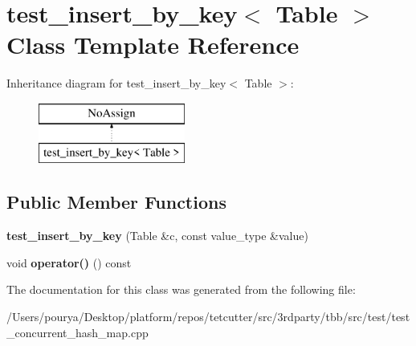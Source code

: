 \hypertarget{classtest__insert__by__key}{}\section{test\+\_\+insert\+\_\+by\+\_\+key$<$ Table $>$ Class Template Reference}
\label{classtest__insert__by__key}
Inheritance diagram for test\+\_\+insert\+\_\+by\+\_\+key$<$ Table $>$\+:\begin{figure}[H]
\begin{center}
\leavevmode
\includegraphics[height=2.000000cm]{classtest__insert__by__key}
\end{center}
\end{figure}
\subsection*{Public Member Functions}
\begin{DoxyCompactItemize}
\item 
\hypertarget{classtest__insert__by__key_acefe8b87da6c931e3f13a774a2da0341}{}{\bfseries test\+\_\+insert\+\_\+by\+\_\+key} (Table \&c, const value\+\_\+type \&value)\label{classtest__insert__by__key_acefe8b87da6c931e3f13a774a2da0341}

\item 
\hypertarget{classtest__insert__by__key_a55fc145bd89c1753e841077b0e38e37b}{}void {\bfseries operator()} () const \label{classtest__insert__by__key_a55fc145bd89c1753e841077b0e38e37b}

\end{DoxyCompactItemize}


The documentation for this class was generated from the following file\+:\begin{DoxyCompactItemize}
\item 
/\+Users/pourya/\+Desktop/platform/repos/tetcutter/src/3rdparty/tbb/src/test/test\+\_\+concurrent\+\_\+hash\+\_\+map.\+cpp\end{DoxyCompactItemize}
